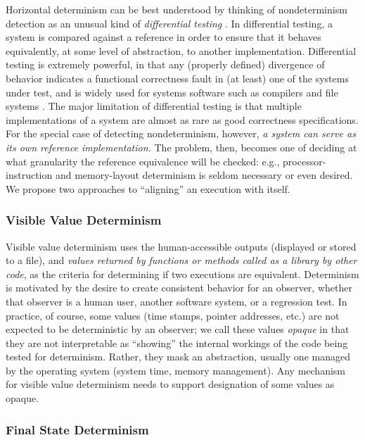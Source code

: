 Horizontal determinism can be best understood by thinking of
nondeterminism detection as an unusual kind of \emph{differential
  testing} \cite{Differential,ICSEDiff}.  In differential testing, a
system is compared against a reference in order to ensure that
it behaves equivalently, at some level of abstraction, to another
implementation.  Differential testing is
extremely powerful, in that any (properly defined) divergence of
behavior indicates a functional correctness fault in (at
least) one of the systems under test, and  is widely
used for systems software such as compilers
\cite{Differential,csmith} and file systems \cite{CFV08,AMAI}.  The major limitation of differential
testing is that multiple implementations of a system are
almost as rare as good correctness specifications.
For the special case of detecting nondeterminism, however, \emph{a
  system can serve as its own reference implementation.}    The
problem, then, becomes one of deciding at what granularity the
reference equivalence will be checked:  e.g., 
processor-instruction and memory-layout determinism is seldom
necessary or even desired.  We propose two approaches to ``aligning'' an
execution with itself.

\subsubsection{Visible Value Determinism}

Visible value determinism uses the human-accessible outputs (displayed
or stored to a file), and \emph{values returned by functions or methods
called as a library by other code}, as the criteria for determining if two executions
are equivalent.  Determinism is motivated by the
desire to create consistent behavior for an observer, whether that
observer is a human user, another software system, or a regression
test.  In practice, of course, some values (time
stamps, pointer addresses, etc.) are not expected to be deterministic
by an observer; we call these values \emph{opaque} in that they are
not interpretable as ``showing'' the internal workings of the code
being tested for determinism.  Rather, they mask an abstraction,
usually one managed by the operating system (system
time, memory management).   Any mechanism for visible value
determinism needs to support designation of some
values as opaque.

\subsubsection{Final State Determinism}

